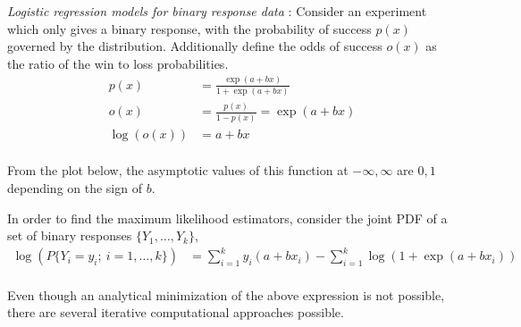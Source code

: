 \textit{Logistic regression models for binary response data} : Consider an experiment which only gives a binary response, with the probability of success $ p(x) $ governed by the distribution. Additionally define the odds of success $ o(x) $ as the ratio of the win to loss probabilities.\\

\begin{align}
	p(x) &= \frac{\exp(a + bx)}{1 + \exp(a + bx)}  \\
	o(x) &= \frac{p(x)}{1 - p(x)} = \exp(a + bx) \\
	\log(o(x)) &= a + bx
\end{align}\\

From the plot below, the asymptotic values of this function at $ -\infty, \infty $ are $ 0, 1 $ depending on the sign of $ b $.


\begin{figure}[H]
	\centering
\end{figure}


In order to find the maximum likelihood estimators, consider the joint PDF of a set of binary responses $ \{Y_1, \dots, Y_k\} $,\\

\begin{align}
	\log(P\{Y_i = y_i;\ i = 1,\dots,k\}) &= \sum\limits_{i = 1}^{k} y_i (a + bx_i) - \sum\limits_{i = 1}^{k} \log(1 + \exp(a +b x_i))
\end{align}\\

Even though an analytical minimization of the above expression is not possible, there are several iterative computational approaches possible.\\


